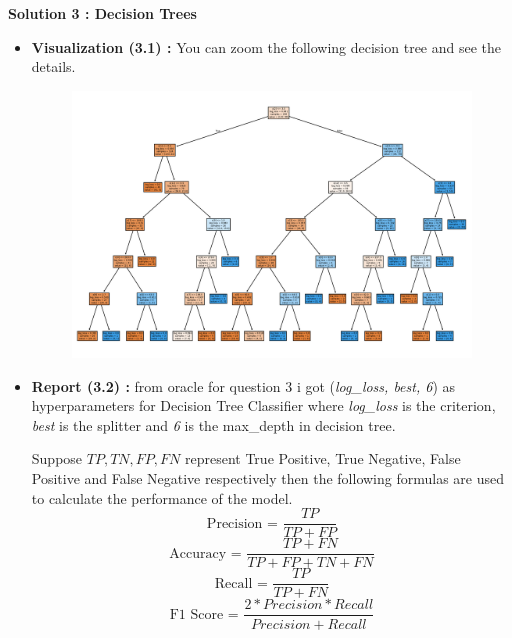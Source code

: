\documentclass{article}
\begin{document}
\noindent    \textbf{Solution 3 : Decision Trees}
\begin{itemize}
    \item \textbf{Visualization (3.1) :}  You can zoom the following decision tree and see the details.
    
    \begin{figure}[h]
        \centering
        \includegraphics[width=\textwidth]{decision_tree.pdf} %
        \label{fig:decision_tree}
    \end{figure}

    \item \textbf{Report (3.2) :} from oracle for question 3 i got (\textit{log\_loss, best, 6}) as hyperparameters for Decision Tree Classifier  where \textit{log\_loss} is the criterion, \textit{best} is the splitter and \textit{6} is the max\_depth in decision tree.
    
    Suppose $TP,TN,FP,FN$ represent True Positive, True Negative, False Positive and False  Negative \newline respectively then the following formulas are used to calculate the performance of the model.
    \[\text{Precision = } \frac{TP}{TP+FP} \]
    \[\text{Accuracy = } \frac{TP+FN}{TP+FP+TN+FN} \]
    \[\text{Recall = } \frac{TP}{TP+FN} \]
    \[\text{F1 Score = } \frac{2*Precision * Recall}{Precision + Recall }\]
    

\end{itemize}
\end{document}
